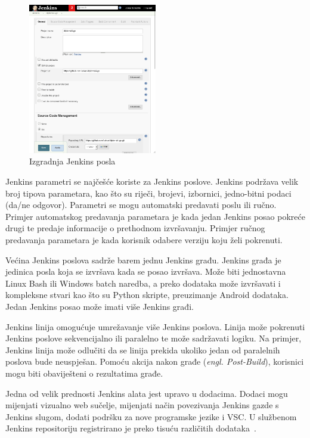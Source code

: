 \begin{figure}
    \centering
    \includegraphics[width=0.5\textwidth]{img/02/jenkins_job.png}
    \caption{Izgradnja Jenkins posla}%
    \label{fig:02jenkinsjob}
\end{figure}

Jenkins parametri se najčešće koriste za Jenkins poslove. Jenkins podržava velik broj tipova
parametara, kao što su riječi, brojevi, izbornici, jedno-bitni podaci (da/ne odgovor). Parametri se
mogu automatski predavati poslu ili ručno. Primjer automatskog predavanja parametara je kada jedan
Jenkins posao pokreće drugi te predaje informacije o prethodnom izvršavanju. Primjer ručnog
predavanja parametara je kada korisnik odabere verziju koju želi pokrenuti.

Većina Jenkins poslova sadrže barem jednu Jenkins građu. Jenkins građa je jedinica posla koja se
izvršava kada se posao izvršava. Može biti jednostavna Linux Bash ili Windows batch naredba, a preko
dodataka može izvršavati i kompleksne stvari kao što su Python skripte, preuzimanje Android
dodataka. Jedan Jenkins posao može imati više Jenkins građi.

Jenkins linija omogućuje umrežavanje više Jenkins poslova. Linija može pokrenuti Jenkins poslove
sekvencijalno ili paralelno te može sadržavati logiku. Na primjer, Jenkins linija može odlučiti da
se linija prekida ukoliko jedan od paralelnih poslova bude neuspješan. Pomoću akcija nakon građe
(\textit{engl. Post-Build}), korisnici mogu biti obaviješteni o rezultatima građe.

Jedna od velik prednosti Jenkins alata jest upravo u dodacima. Dodaci mogu mijenjati vizualno web
sučelje, mijenjati način povezivanja Jenkins gazde s Jenkins slugom, dodati podršku za nove
programske jezike i VSC. U službenom Jenkins repositoriju registrirano je preko tisuću različitih
dodataka~\citep{JenkisPlugins}.

